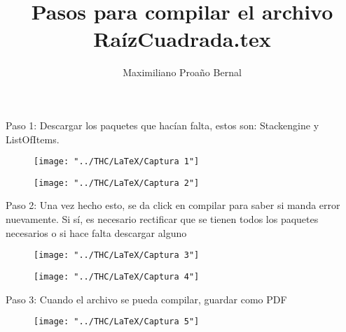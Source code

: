 \documentclass[]{article}
\title{Pasos para compilar el archivo RaízCuadrada.tex}
\author{Maximiliano Proaño Bernal}
\begin{document}
\maketitle
Paso 1: Descargar los paquetes que hacían falta, estos son: Stackengine y ListOfItems.
\begin{figure}[H]
	\centering
	\texttt{[image: "../THC/LaTeX/Captura 1"]}
	\caption{}
	\label{fig:captura-1}
\end{figure}

\begin{figure}[H]
	\centering
	\texttt{[image: "../THC/LaTeX/Captura 2"]}
	\caption{}
	\label{fig:captura-2}
\end{figure}

Paso 2: Una vez hecho esto, se da click en compilar para saber si manda error nuevamente. Si sí, es necesario rectificar que se tienen todos los paquetes necesarios o si hace falta descargar alguno
\begin{figure}[H]
	\centering
	\texttt{[image: "../THC/LaTeX/Captura 3"]}
	\caption{}
	\label{fig:captura-3}
\end{figure}

\begin{figure}[H]
	\centering
	\texttt{[image: "../THC/LaTeX/Captura 4"]}
	\caption{}
	\label{fig:captura-4}
\end{figure}

Paso 3: Cuando el archivo se pueda compilar, guardar como PDF
\begin{figure}[H]
	\centering
	\texttt{[image: "../THC/LaTeX/Captura 5"]}
	\caption{}
	\label{fig:captura-5}
\end{figure}

\section{}
\end{document}
